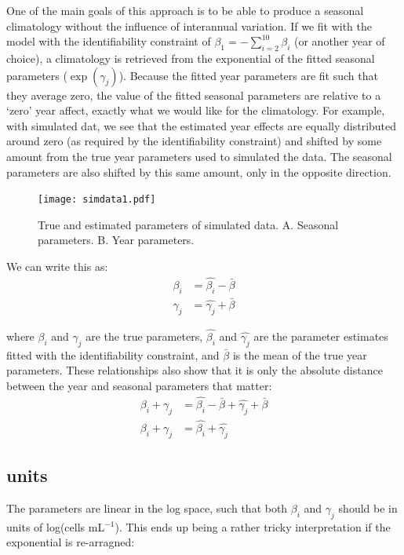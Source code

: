 \documentclass[11pt]{article}
\begin{document}
One of the main goals of this approach is to be able to produce a seasonal climatology without the influence of interannual variation. If we fit with the model with the identifiability constraint of $\beta_1 = - \sum_{i=2}^{10}\beta_i$ (or another year of choice), a climatology is retrieved from the exponential of the fitted seasonal parameters ($\exp(\gamma_j)$).  Because the fitted year parameters are fit such that they average zero, the value of the fitted seasonal parameters are relative to a `zero' year affect, exactly what we would like for the climatology.  For example, with simulated dat, we see that the estimated year effects are equally distributed around zero (as required by the identifiability constraint) and shifted by some amount from the true year parameters used to simulated the data. The seasonal parameters are also shifted by this same amount, only in the opposite direction.

\begin{figure}[h]
\centering
\texttt{[image: simdata1.pdf]}
\caption{True and estimated parameters of simulated data. A. Seasonal parameters. B. Year parameters.}
\end{figure}

We can write this as:
\begin{align}
\beta_i &= \hat{\beta_i} - \bar{\beta}\label{eqn1} \\
\gamma_j &= \hat{\gamma_j} + \bar{\beta} \label{eqn2}
\end{align}

\noindent where $\beta_i$ and $\gamma_j$ are the true parameters, $\hat{\beta_i}$ and $\hat{\gamma_j}$ are the parameter estimates fitted with the identifiability constraint, and $\bar{\beta}$ is the mean of the true year parameters. These relationships also show that it is only the absolute distance between the year and seasonal parameters that matter:
\begin{align}
\beta_i + \gamma_j &= \hat{\beta_i} - \bar{\beta} + \hat{\gamma_j} + \bar{\beta} \\
\beta_i + \gamma_j &= \hat{\beta_i} + \hat{\gamma_j} \label{eqn4}
\end{align}

\subsection{units}
 The parameters are linear in the log space, such that both $\beta_i$ and $\gamma_j$ should be in units of log(cells mL$^{-1}$). This ends up being a rather tricky interpretation if the exponential is re-arragned:
\end{document}

